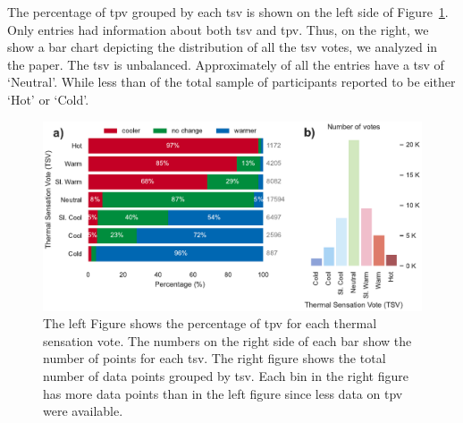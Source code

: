 The percentage of \ac{tpv} grouped by each \ac{tsv} is shown on the left side of Figure~\ref{fig:bar_plot_tp_by_ts}.
Only  entries had information about both \ac{tsv} and \ac{tpv}.
Thus, on the right, we show a bar chart depicting the distribution of all the \ac{tsv} votes, we analyzed in the paper.
The \ac{tsv} is unbalanced. 
Approximately  of all the entries have a \ac{tsv} of `Neutral'.
While less than  of the total sample of participants reported to be either `Hot' or `Cold'.

\begin{figure}[htb!]
    \centering
    \includegraphics[width=\textwidth]{figures/bar_plot_tp_by_ts}
    \caption{The left Figure shows the percentage of \ac{tpv} for each thermal sensation vote.
    The numbers on the right side of each bar show the number of points for each \ac{tsv}.
    The right figure shows the total number of data points grouped by \ac{tsv}.
    Each bin in the right figure has more data points than in the left figure since less data on \ac{tpv} were available.}
    \label{fig:bar_plot_tp_by_ts}
\end{figure}

